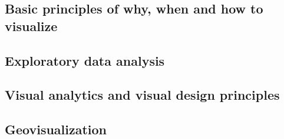 \subsection{Basic principles of why, when and how to visualize}
\label{s:basics}


\subsection{Exploratory data analysis}
\label{s:eda}


\subsection{Visual analytics and visual design principles}
\label{s:va}


\subsection{Geovisualization}










